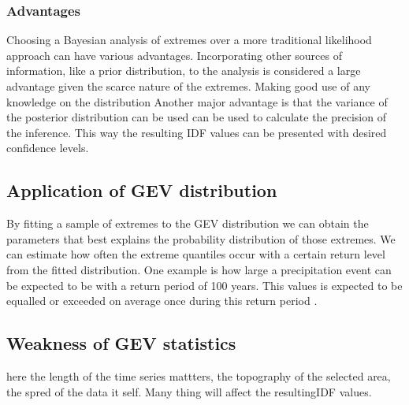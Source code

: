 \subsubsection{Advantages}
Choosing a Bayesian analysis of extremes over a more traditional likelihood approach can have various advantages. Incorporating other sources of information, like a prior distribution, to the analysis is considered a large advantage given the scarce nature of the extremes. Making good use of any knowledge on the distribution Another major advantage is that the variance of the posterior distribution can be used can be used to calculate the precision of the inference. This way the resulting IDF values can be presented with desired confidence levels.   




\subsection{Application of GEV distribution}
By fitting a sample of extremes to the GEV distribution we can obtain the parameters that best explains the probability distribution of those extremes. We can estimate how often the extreme quantiles occur with a certain return level from the fitted distribution. One example is how large a precipitation event can be expected to be with a return period of 100 years. This values is expected to be equalled or exceeded on average once during this return period \cite{gmao}.

\subsection{Weakness of GEV statistics}

here the length of the time series mattters, the topography of the selected area, the spred of the data it self. Many thing will affect the resultingIDF values. 